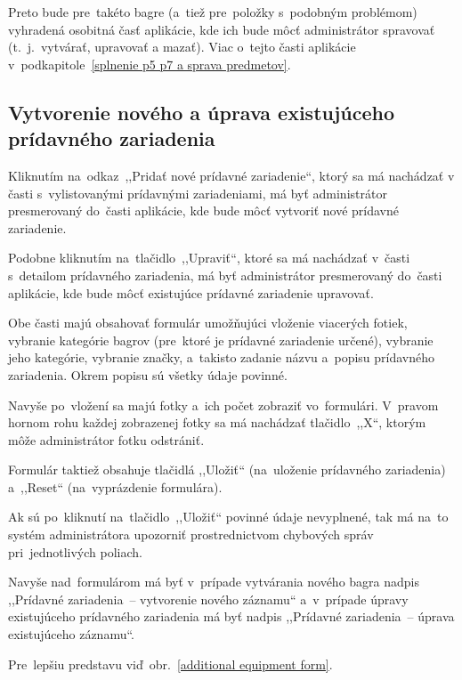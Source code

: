 Preto bude pre~takéto bagre (a~tiež pre~položky s~podobným problémom) vyhradená osobitná časť aplikácie, kde ich bude môcť administrátor spravovať (t.~j.~vytvárať, upravovať a mazať). Viac o~tejto časti aplikácie v~podkapitole~\ref{splnenie p5 p7 a sprava predmetov}.

\subsection{Vytvorenie nového a úprava existujúceho prídavného zariadenia}

Kliknutím na~odkaz~,,Pridať nové prídavné zariadenie``, ktorý sa má nachádzať v časti s~vylistovanými prídavnými zariadeniami, má byť administrátor presmerovaný do~časti aplikácie, kde bude môcť vytvoriť nové prídavné zariadenie.

Podobne kliknutím na~tlačidlo~,,Upraviť``, ktoré sa má nachádzať v~časti s~detailom prídavného zariadenia, má byť administrátor presmerovaný do~časti aplikácie, kde bude môcť existujúce prídavné zariadenie upravovať.

Obe časti majú obsahovať formulár umožňujúci vloženie viacerých fotiek, vybranie kategórie bagrov (pre~ktoré je prídavné zariadenie určené), vybranie jeho kategórie, vybranie značky, a~takisto zadanie názvu a~popisu prídavného zariadenia. Okrem popisu sú všetky údaje povinné.

Navyše po~vložení sa majú fotky a~ich počet zobraziť vo~formulári. V~pravom hornom rohu každej zobrazenej fotky sa má nachádzať tlačidlo~,,X``, ktorým môže administrátor fotku odstrániť.

Formulár taktiež obsahuje tlačidlá ,,Uložiť`` (na~uloženie prídavného zariadenia) a~,,Reset`` (na~vyprázdenie formulára).

Ak sú po~kliknutí na~tlačidlo~,,Uložiť`` povinné údaje nevyplnené, tak má na~to systém administrátora upozorniť prostrednictvom chybových správ pri~jednotlivých poliach.

Navyše nad~formulárom má byť v~prípade vytvárania nového bagra nadpis ,,Prídavné zariadenia~-- vytvorenie nového záznamu`` a~v~prípade úpravy existujúceho prídavného zariadenia má byť nadpis ,,Prídavné zariadenia~-- úprava existujúceho záznamu``.

Pre~lepšiu predstavu viď~obr.~\ref{additional equipment form}.

